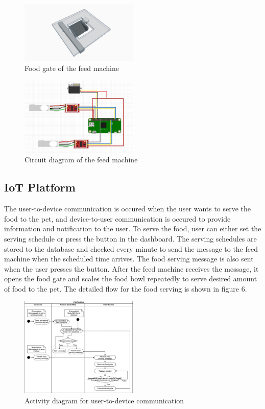 \documentclass[conference]{IEEEtran}
\begin{document}
\begin{figure}[htbp]
\centerline{\includegraphics[width=0.5\textwidth]{./images/servo_gate.png}}
\caption{Food gate of the feed machine}
\label{fig}
\end{figure}

\begin{figure}[htbp]
\centerline{\includegraphics[width=0.5\textwidth]{./images/feed machine circuit.jpg}}
\caption{Circuit diagram of the feed machine}
\label{fig}
\end{figure}

\subsection{IoT Platform}
The user-to-device communication is occured when the user wants to serve the food to the pet, and device-to-user communication is occured to provide information and notification to the user. To serve the food, user can either set the serving schedule or press the button in the dashboard. The serving schedules are stored to the database and checked every minute to send the message to the feed machine when the scheduled time arrives. The food serving message is also sent when the user presses the button. After the feed machine receives the message, it opens the food gate and scales the food bowl repeatedly to serve desired amount of food to the pet. The detailed flow for the food serving is shown in figure 6.

\begin{figure}[htbp]
\centerline{\includegraphics[width=0.5\textwidth]{./images/user2device.png}}
\caption{Activity diagram for user-to-device communication}
\label{fig}
\end{figure}
\end{document}
